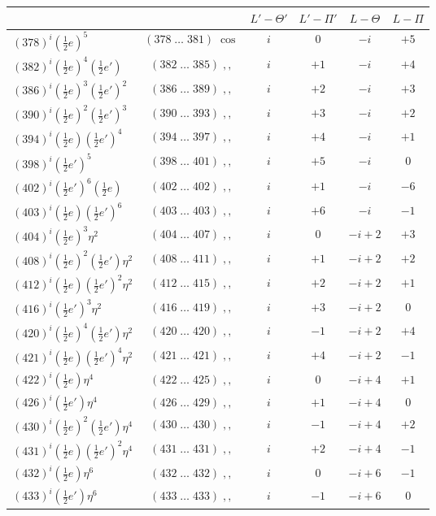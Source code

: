 \documentclass[11pt]{article}
\begin{document}
\begin{center}
\begin{tabular}{|l|c|c|c|c|c|}
\hline
 & & $L'-\Theta'$ & $L'-\Pi'$ & $L-\Theta$ & $L-\Pi$ \\
\hline
$(378)^i(\tfrac{1}{2}e)^5$ & $(378\;\ldots\;381)\;\cos$ & $i$ & $0$ & $-i$ & $+5$ \\
$(382)^i(\tfrac{1}{2}e)^4(\tfrac{1}{2}e')$ & $(382\;\ldots\;385)\;,,$ & $i$ & $+1$ & $-i$ & $+4$ \\
$(386)^i(\tfrac{1}{2}e)^3(\tfrac{1}{2}e')^2$ & $(386\;\ldots\;389)\;,,$ & $i$ & $+2$ & $-i$ & $+3$ \\
$(390)^i(\tfrac{1}{2}e)^2(\tfrac{1}{2}e')^3$ & $(390\;\ldots\;393)\;,,$ & $i$ & $+3$ & $-i$ & $+2$ \\
$(394)^i(\tfrac{1}{2}e)(\tfrac{1}{2}e')^4$ & $(394\;\ldots\;397)\;,,$ & $i$ & $+4$ & $-i$ & $+1$ \\
$(398)^i(\tfrac{1}{2}e')^5$ & $(398\;\ldots\;401)\;,,$ & $i$ & $+5$ & $-i$ & $0$ \\
$(402)^i(\tfrac{1}{2}e')^6(\tfrac{1}{2}e)$ & $(402\;\ldots\;402)\;,,$ & $i$ & $+1$ & $-i$ & $-6$ \\
$(403)^i(\tfrac{1}{2}e)(\tfrac{1}{2}e')^6$ & $(403\;\ldots\;403)\;,,$ & $i$ & $+6$ & $-i$ & $-1$ \\
$(404)^i(\tfrac{1}{2}e)^3\eta^2$ & $(404\;\ldots\;407)\;,,$ & $i$ & $0$ & $-i+2$ & $+3$ \\
$(408)^i(\tfrac{1}{2}e)^2(\tfrac{1}{2}e')\eta^2$ & $(408\;\ldots\;411)\;,,$ & $i$ & $+1$ & $-i+2$ & $+2$ \\
$(412)^i(\tfrac{1}{2}e)(\tfrac{1}{2}e')^2\eta^2$ & $(412\;\ldots\;415)\;,,$ & $i$ & $+2$ & $-i+2$ & $+1$ \\
$(416)^i(\tfrac{1}{2}e')^3\eta^2$ & $(416\;\ldots\;419)\;,,$ & $i$ & $+3$ & $-i+2$ & $0$ \\
$(420)^i(\tfrac{1}{2}e)^4(\tfrac{1}{2}e')\eta^2$ & $(420\;\ldots\;420)\;,,$ & $i$ & $-1$ & $-i+2$ & $+4$ \\
$(421)^i(\tfrac{1}{2}e)(\tfrac{1}{2}e')^4\eta^2$ & $(421\;\ldots\;421)\;,,$ & $i$ & $+4$ & $-i+2$ & $-1$ \\
$(422)^i(\tfrac{1}{2}e)\eta^4$ & $(422\;\ldots\;425)\;,,$ & $i$ & $0$ & $-i+4$ & $+1$ \\
$(426)^i(\tfrac{1}{2}e')\eta^4$ & $(426\;\ldots\;429)\;,,$ & $i$ & $+1$ & $-i+4$ & $0$ \\
$(430)^i(\tfrac{1}{2}e)^2(\tfrac{1}{2}e')\eta^4$ & $(430\;\ldots\;430)\;,,$ & $i$ & $-1$ & $-i+4$ & $+2$ \\
$(431)^i(\tfrac{1}{2}e)(\tfrac{1}{2}e')^2\eta^4$ & $(431\;\ldots\;431)\;,,$ & $i$ & $+2$ & $-i+4$ & $-1$ \\
$(432)^i(\tfrac{1}{2}e)\eta^6$ & $(432\;\ldots\;432)\;,,$ & $i$ & $0$ & $-i+6$ & $-1$ \\
$(433)^i(\tfrac{1}{2}e')\eta^6$ & $(433\;\ldots\;433)\;,,$ & $i$ & $-1$ & $-i+6$ & $0$ \\
\hline
\end{tabular}
\end{center}
\end{document}
